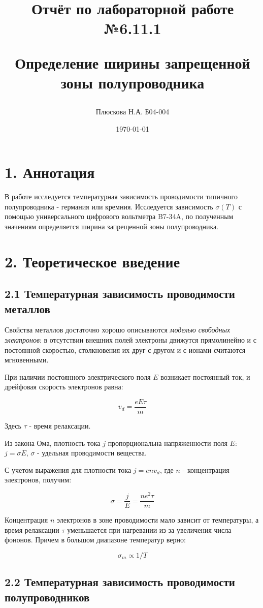 \documentclass[a4paper,12pt]{report}
\title{Отчёт по лабораторной работе №6.11.1

Определение ширины запрещенной зоны полупроводника}
\author{Плюскова Н.А. Б04-004 }
\date{\today}
\begin{document}
\maketitle

\section*{1. Аннотация}

В работе исследуется температурная зависимость проводимости типичного полупроводника - германия или кремния. Исследуется зависимость $\sigma(T)$ с помощью универсального цифрового вольтметра B7-34A, по полученным значениям определяется ширина запрещенной зоны полупроводника.

\section*{2. Теоретическое введение}
\subsection*{2.1 Температурная зависимость проводимости металлов}
	
	Свойства металлов достаточно хорошо описываются \textit{моделью свободных электронов}: в отсутствии внешних полей электроны движутся прямолинейно и с постоянной скоростью, столкновения их друг с другом и с ионами считаются мгновенными. 
	
	При наличии постоянного электрического поля $E$ возникает постоянный ток, и дрейфовая скорость электронов равна: 
	
	\[ v_d = \frac{eE\tau}{m} \]
	
	Здесь $\tau$ - время релаксации. 
	
	Из закона Ома, плотность тока $j$ пропорциональна напряженности поля $E$: $j = \sigma E$, $\sigma$ - удельная проводимости вещества. 
	
	С учетом выражения для плотности тока $j = env_d$, где $n$ - концентрация электронов, получим: 
	
	\[ \sigma = \frac{j}{E} = \frac{ne^2\tau}{m} \]
	
	Концентрация $n$ электронов в зоне проводимости мало зависит от температуры, а время релаксации $\tau$ уменьшается при нагревании из-за увеличения числа фононов. Причем в большом диапазоне температур верно: 
	
	\[ \sigma_m \propto 1/T \]
	
\subsection* {2.2 Температурная зависимость проводимости полупроводников}
	
\end{document}
